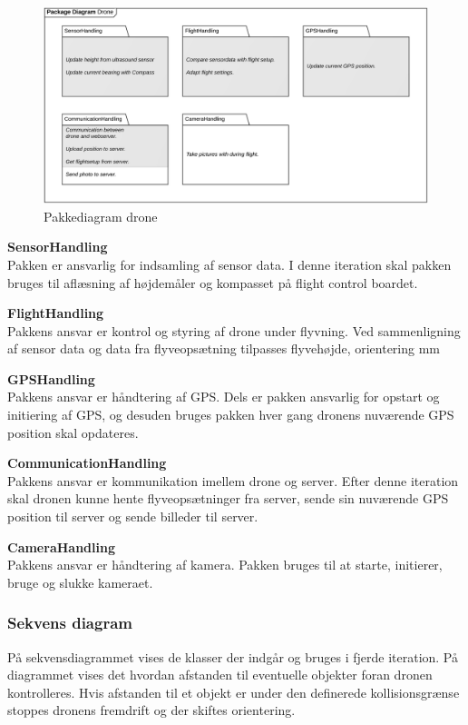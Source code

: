 \begin{figure}[H]
	\centering
	\includegraphics[width=1\textwidth]{Billeder/pakke_diagrammer/iteration3_drone.png}
	\vspace{-0.5cm}
	\caption{Pakkediagram drone}
	\label{fig:iteration2_pakke_diagram_drone}
\end{figure}

\textbf{SensorHandling}\\
Pakken er ansvarlig for indsamling af sensor data. I denne iteration skal pakken bruges til aflæsning af højdemåler og kompasset på flight control boardet. 

\textbf{FlightHandling}\\
Pakkens ansvar er kontrol og styring af drone under flyvning. Ved sammenligning af sensor data og data fra flyveopsætning tilpasses flyvehøjde, orientering mm

\textbf{GPSHandling}\\
Pakkens ansvar er håndtering af GPS. Dels er pakken ansvarlig for opstart og initiering af GPS, og desuden bruges pakken hver gang dronens nuværende GPS position skal opdateres.

\textbf{CommunicationHandling}\\
Pakkens ansvar er kommunikation imellem drone og server. Efter denne iteration skal dronen kunne hente flyveopsætninger fra server, sende sin nuværende GPS position til server og sende billeder til server.

\textbf{CameraHandling}\\
Pakkens ansvar er håndtering af kamera. Pakken bruges til at starte, initierer, bruge og slukke kameraet.


\newpage
\subsubsection*{Sekvens diagram}
\vspace{-0.2cm}
På sekvensdiagrammet vises de klasser der indgår og bruges i fjerde iteration. 
På diagrammet vises det hvordan afstanden til eventuelle objekter foran dronen kontrolleres. Hvis afstanden til et objekt er under den definerede kollisionsgrænse stoppes dronens fremdrift og der skiftes orientering. 


